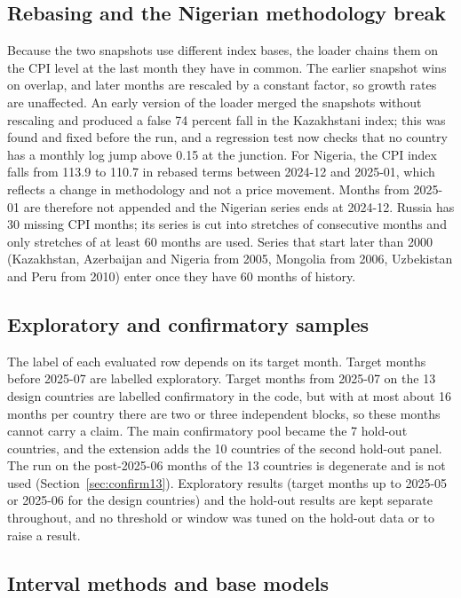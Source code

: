\subsection{Rebasing and the Nigerian methodology break}

Because the two snapshots use different index bases, the loader chains them on the CPI level at the last month they have in common. The earlier snapshot wins on overlap, and later months are rescaled by a constant factor, so growth rates are unaffected. An early version of the loader merged the snapshots without rescaling and produced a false 74 percent fall in the Kazakhstani index; this was found and fixed before the run, and a regression test now checks that no country has a monthly log jump above 0.15 at the junction. For Nigeria, the CPI index falls from 113.9 to 110.7 in rebased terms between 2024-12 and 2025-01, which reflects a change in methodology and not a price movement. Months from 2025-01 are therefore not appended and the Nigerian series ends at 2024-12. Russia has 30 missing CPI months; its series is cut into stretches of consecutive months and only stretches of at least 60 months are used. Series that start later than 2000 (Kazakhstan, Azerbaijan and Nigeria from 2005, Mongolia from 2006, Uzbekistan and Peru from 2010) enter once they have 60 months of history.

\subsection{Exploratory and confirmatory samples}\label{sec:samples}

The label of each evaluated row depends on its target month. Target months before 2025-07 are labelled exploratory. Target months from 2025-07 on the 13 design countries are labelled confirmatory in the code, but with at most about 16 months per country there are two or three independent blocks, so these months cannot carry a claim. The main confirmatory pool became the 7 hold-out countries, and the extension adds the 10 countries of the second hold-out panel. The run on the post-2025-06 months of the 13 countries is degenerate and is not used (Section~\ref{sec:confirm13}). Exploratory results (target months up to 2025-05 or 2025-06 for the design countries) and the hold-out results are kept separate throughout, and no threshold or window was tuned on the hold-out data or to raise a result.

\subsection{Interval methods and base models}

